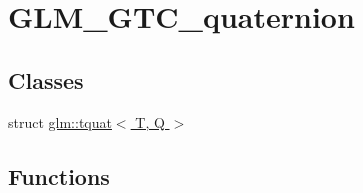 \hypertarget{group__gtc__quaternion}{}\section{G\+L\+M\+\_\+\+G\+T\+C\+\_\+quaternion}
\label{group__gtc__quaternion}
\subsection*{Classes}
\begin{DoxyCompactItemize}
\item 
struct \hyperlink{structglm_1_1tquat}{glm\+::tquat$<$ T, Q $>$}
\end{DoxyCompactItemize}
\subsection*{Functions}
